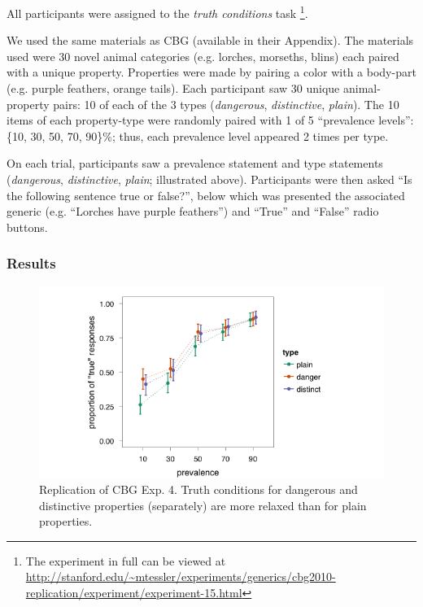 \documentclass[10pt,letterpaper]{article}
\begin{document}
All participants were assigned to the \emph{truth conditions} task \footnote{The experiment in full can be viewed at \url{http://stanford.edu/~mtessler/experiments/generics/cbg2010-replication/experiment/experiment-15.html}}. 
 
We used the same materials as CBG (available in their Appendix). The materials used were 30 novel animal categories (e.g. lorches, morseths, blins) each paired with a unique property. Properties were made by pairing a color with a body-part (e.g. purple feathers, orange tails). Each participant saw 30 unique animal-property pairs: 10 of each of the 3 types (\emph{dangerous}, \emph{distinctive}, \emph{plain}). The 10 items of each property-type were randomly paired with 1 of 5 ``prevalence levels'': \{10, 30, 50, 70, 90\}\%; thus, each prevalence level appeared 2 times per type. 

On each trial, participants saw a prevalence statement and type statements (\emph{dangerous}, \emph{distinctive}, \emph{plain}; illustrated above). 
Participants were then asked ``Is the following sentence true or false?'', below which was presented the associated generic (e.g. ``Lorches have purple feathers'') and ``True'' and ``False'' radio buttons. 
 
\subsubsection{Results}

\begin{figure}
\centering
    \includegraphics[width=0.8\columnwidth]{dd_separate_truthconds}
    \caption{Replication of CBG Exp. 4. Truth conditions for dangerous and distinctive properties (separately) are more relaxed than for plain properties.}
  \label{fig:ddseparate}
\end{figure}
\end{document}
